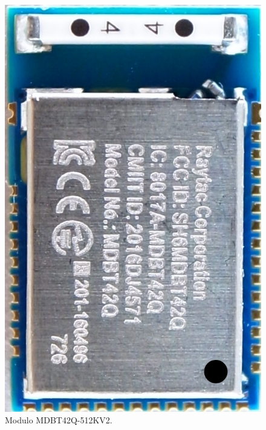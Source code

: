 \begin{figure}[htpb]
	\centering
	\includegraphics[scale=0.15]{./Figures/MDBT42Q.jpg}
	\caption{Modulo MDBT42Q-512KV2.}
	\label{fig:MDBT42}
\end{figure}

